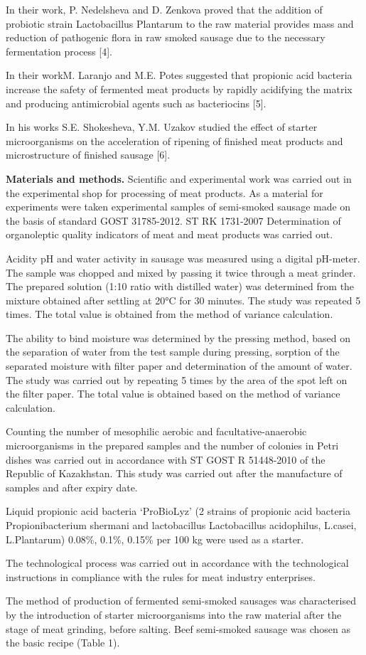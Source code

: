 \begin{multicols}{2}
In their work, P. Nedelsheva and D. Zenkova proved that the addition of
probiotic strain Lactobacillus Plantarum to the raw material provides
mass and reduction of pathogenic flora in raw smoked sausage due to the
necessary fermentation process {[}4{]}.

In their workM. Laranjo and M.E. Potes suggested that propionic acid
bacteria increase the safety of fermented meat products by rapidly
acidifying the matrix and producing antimicrobial agents such as
bacteriocins {[}5{]}.

In his works S.E. Shokesheva, Y.M. Uzakov studied the effect of starter
microorganisms on the acceleration of ripening of finished meat products
and microstructure of finished sausage {[}6{]}.

{\bfseries Materials and methods.} Scientific and experimental work was
carried out in the experimental shop for processing of meat products. As
a material for experiments were taken experimental samples of
semi-smoked sausage made on the basis of standard GOST 31785-2012. ST RK
1731-2007 Determination of organoleptic quality indicators of meat and
meat products was carried out.

Acidity pH and water activity in sausage was measured using a digital
pH-meter. The sample was chopped and mixed by passing it twice through a
meat grinder. The prepared solution (1:10 ratio with distilled water)
was determined from the mixture obtained after settling at 20°C for 30
minutes. The study was repeated 5 times. The total value is obtained
from the method of variance calculation.

The ability to bind moisture was determined by the pressing method,
based on the separation of water from the test sample during pressing,
sorption of the separated moisture with filter paper and determination
of the amount of water. The study was carried out by repeating 5 times
by the area of the spot left on the filter paper. The total value is
obtained based on the method of variance calculation.

Counting the number of mesophilic aerobic and facultative-anaerobic
microorganisms in the prepared samples and the number of colonies in
Petri dishes was carried out in accordance with ST GOST R 51448-2010 of
the Republic of Kazakhstan. This study was carried out after the
manufacture of samples and after expiry date.

Liquid propionic acid bacteria `ProBioLyz' (2 strains of propionic acid
bacteria Propionibacterium shermani and lactobacillus Lactobacillus
acidophilus, L.casei, L.Plantarum) 0.08\%, 0.1\%, 0.15\% per 100 kg were
used as a starter.

The technological process was carried out in accordance with the
technological instructions in compliance with the rules for meat
industry enterprises.

The method of production of fermented semi-smoked sausages was
characterised by the introduction of starter microorganisms into the raw
material after the stage of meat grinding, before salting. Beef
semi-smoked sausage was chosen as the basic recipe (Table 1).
\end{multicols}

